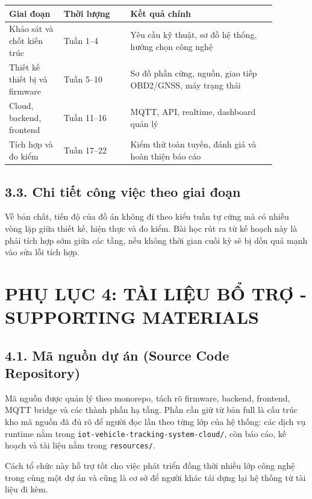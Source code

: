 \documentclass[a4paper]{extarticle}
\newcommand{\appendixsection}[1]{\clearpage\section{#1}}
\begin{document}
\begin{center}
\begin{tabular}{|p{0.18\linewidth}|p{0.22\linewidth}|p{0.48\linewidth}|}
\hline
\textbf{Giai đoạn} & \textbf{Thời lượng} & \textbf{Kết quả chính} \\
\hline
Khảo sát và chốt kiến trúc & Tuần 1--4 & Yêu cầu kỹ thuật, sơ đồ hệ thống, hướng chọn công nghệ \\
\hline
Thiết kế thiết bị và firmware & Tuần 5--10 & Sơ đồ phần cứng, nguồn, giao tiếp OBD2/GNSS, máy trạng thái \\
\hline
Cloud, backend, frontend & Tuần 11--16 & MQTT, API, realtime, dashboard quản lý \\
\hline
Tích hợp và đo kiểm & Tuần 17--22 & Kiểm thử toàn tuyến, đánh giá và hoàn thiện báo cáo \\
\hline
\end{tabular}
\end{center}

\subsection{3.3. Chi tiết công việc theo giai
đoạn}\label{33-chi-tiux1ebft-cuxf4ng-viux1ec7c-theo-giai-ux111oux1ea1n}

Về bản chất, tiến độ của đồ án không đi theo kiểu tuần tự cứng mà có nhiều vòng lặp giữa thiết kế, hiện thực và đo kiểm. Bài học rút ra từ kế hoạch này là phải tích hợp sớm giữa các tầng, nếu không thời gian cuối kỳ sẽ bị dồn quá mạnh vào sửa lỗi tích hợp.

\appendixsection{PHỤ LỤC 4: TÀI LIỆU BỔ TRỢ - SUPPORTING
MATERIALS}\label{phux1ee5-lux1ee5c-4-tuxe0i-liux1ec7u-bux1ed5-trux1ee3---supporting-materials}

\subsection{4.1. Mã nguồn dự án (Source Code
Repository)}\label{41-muxe3-nguux1ed3n-dux1ef1-uxe1n-source-code-repository}

Mã nguồn được quản lý theo monorepo, tách rõ firmware, backend, frontend, MQTT bridge và các thành phần hạ tầng. Phần cần giữ từ bản full là cấu trúc kho mã nguồn đã đủ rõ để người đọc lần theo từng lớp của hệ thống: các dịch vụ runtime nằm trong \texttt{iot-vehicle-tracking-system-cloud/}, còn báo cáo, kế hoạch và tài liệu nằm trong \texttt{resources/}.

Cách tổ chức này hỗ trợ tốt cho việc phát triển đồng thời nhiều lớp công nghệ trong cùng một dự án và cũng là cơ sở để người khác tái dựng lại hệ thống từ tài liệu đi kèm.
\end{document}
